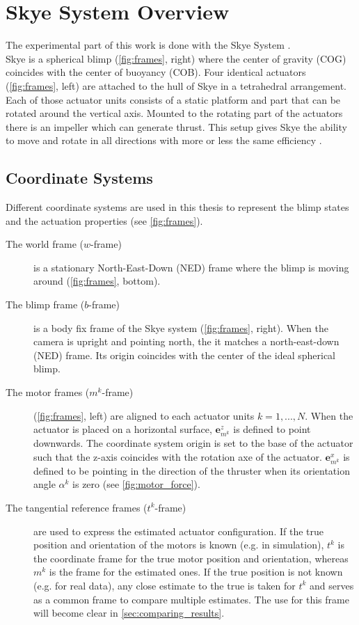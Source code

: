 \section{Skye System Overview}
The experimental part of this work is done with the Skye System \citep{Skye2013}.\\
Skye is a spherical blimp (\cref{fig:frames}, right) where the center of gravity (COG) coincides with the center of buoyancy (COB).
Four identical actuators (\cref{fig:frames}, left) are attached to the hull of Skye in a tetrahedral arrangement.
Each of those actuator units consists of a static platform and part that can be rotated around the vertical axis.
Mounted to the rotating part of the actuators there is an impeller which can generate thrust.
This setup gives Skye the ability to move and rotate in all directions with more or less the same efficiency \citep[see][chap. 3]{Schaffner2012}.

\subsection{Coordinate Systems}
\label{sub:coordinate_systems}
Different coordinate systems are used in this thesis to represent the blimp states and the actuation properties (see \cref{fig:frames}).
\begin{description}
\item[The world frame ($w$-frame)] is a stationary North-East-Down (NED) frame where the blimp is moving around (\cref{fig:frames}, bottom).
\item[The blimp frame ($b$-frame)] is a body fix frame of the Skye system (\cref{fig:frames}, right).
When the camera is upright and pointing north, the it matches a north-east-down (NED) frame.
Its origin coincides with the center of the ideal spherical blimp.
\item[The motor frames ($m^k$-frame)] (\cref{fig:frames}, left) are aligned to each actuator units $k=1,...,N$.
When the actuator is placed on a horizontal surface, $\mathbf{e}_{m^k}^z$ is defined to point downwards.
The coordinate system origin is set to the base of the actuator such that the z-axis coincides with the rotation axe of the actuator.
$\mathbf{e}_{m^k}^x$ is defined to be pointing in the direction of the thruster when its orientation angle $\alpha^k$ is zero (see \cref{fig:motor_force}).
\item[The tangential reference frames ($t^k$-frame)] are used to express the estimated actuator configuration.
If the true position and orientation of the motors is known (e.g. in simulation), $t^k$ is the coordinate frame for the true motor position and orientation, whereas $m^k$ is the frame for the estimated ones.
If the true position is not known (e.g. for real data), any close estimate to the true is taken for $t^k$ and serves as a common frame to compare multiple estimates.
The use for this frame will become clear in \cref{sec:comparing_results}.
\end{description}

